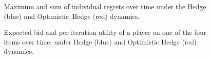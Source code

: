 \documentclass[a4paper]{article}
\theoremstyle{definition}
\begin{document}
\begin{figure}[htbp]
\centering
{}
\quad
{}
\caption{Maximum and sum of individual regrets over time under the
  Hedge (blue) and \mbox{Optimistic Hedge} (red) dynamics.}\label{fig:regrets}
\end{figure}



\begin{figure}[htbp]
\centering
{}
\quad
{}
\caption{Expected bid and per-iteration utility of a player on one of
  the four items over time, under Hedge (blue) and {Optimistic Hedge}
  (red) dynamics.}\label{fig:bids}
\end{figure}
\clearpage
{}


\printbibliography
\end{document}
